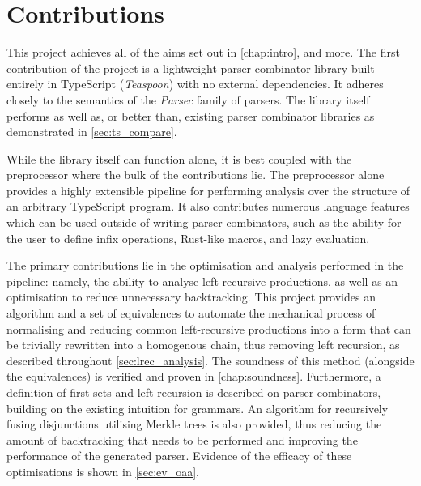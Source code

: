 \section{Contributions}
\label{sec:contributions}

This project achieves all of the aims set out in \autoref{chap:intro}, and more.
The first contribution of the project is a lightweight parser combinator library built entirely in TypeScript (\textit{Teaspoon}) with no external dependencies.
It adheres closely to the semantics of the \textit{Parsec} family of parsers.
The library itself performs as well as, or better than, existing parser combinator libraries as demonstrated in \autoref{sec:ts_compare}.

While the library itself can function alone, it is best coupled with the preprocessor where the bulk of the contributions lie.
The preprocessor alone provides a highly extensible pipeline for performing analysis over the structure of an arbitrary TypeScript program.
It also contributes numerous language features which can be used outside of writing parser combinators, such as the ability for the user to define infix operations, Rust-like macros, and lazy evaluation.

The primary contributions lie in the optimisation and analysis performed in the pipeline: namely, the ability to analyse left-recursive productions, as well as an optimisation to reduce unnecessary backtracking.
This project provides an algorithm and a set of equivalences to automate the mechanical process of normalising and reducing common left-recursive productions into a form that can be trivially rewritten into a homogenous chain, thus removing left recursion, as described throughout \autoref{sec:lrec_analysis}.
The soundness of this method (alongside the equivalences) is verified and proven in \autoref{chap:soundness}.
Furthermore, a definition of first sets and left-recursion is described on parser combinators, building on the existing intuition for grammars.
An algorithm for recursively fusing disjunctions utilising Merkle trees is also provided, thus reducing the amount of backtracking that needs to be performed and improving the performance of the generated parser.
Evidence of the efficacy of these optimisations is shown in \autoref{sec:ev_oaa}.
